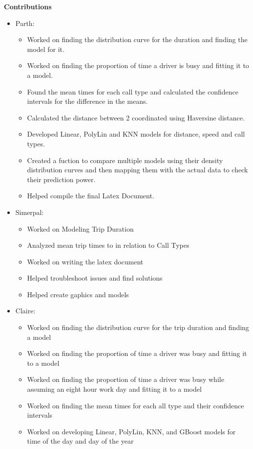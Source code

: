 \documentclass[11pt]{article}
\begin{document}
\textbf{Contributions}
\begin{itemize}
	\item Parth: \begin{itemize}
		\item Worked on finding the distribution curve for the duration and finding the model for it.
		\item Worked on finding the proportion of time a driver is busy and fitting it to a model.
		\item Found the mean times for each call type and calculated the confidence intervals for the difference in the means.
		\item Calculated the distance between 2 coordinated using Haversine distance.
		\item Developed Linear, PolyLin and KNN models for distance, speed and call types. 
		\item Created a fuction to compare multiple models using their density distribution curves and then mapping them with the actual data to check their prediction power.
		\item Helped compile the final Latex Document.
	\end{itemize}
	\item Simerpal: \begin{itemize}
		\item Worked on Modeling Trip Duration
		\item Analyzed mean trip times to in relation to Call Types
		\item Worked on writing the latex document
		\item Helped troubleshoot issues and find solutions
		\item Helped create gaphics and models
	\end{itemize}
	\item Claire: \begin{itemize}
		\item Worked on finding the distribution curve for the trip duration and finding a model 
		\item Worked on finding the proportion of time a driver was busy and fitting it to a model
		\item Worked on finding the proportion of time a driver was busy while assuming an eight hour work day and fitting it to a model
		\item Worked on finding the mean times for each all type and their confidence intervals
		\item Worked on developing Linear, PolyLin, KNN, and GBoost models for time of the day and day of the year

\end{itemize}
\end{itemize}
\end{document}
